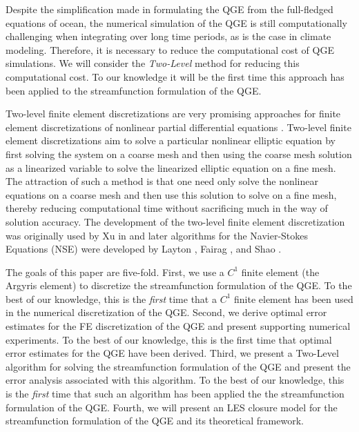 Despite the simplification made in formulating the QGE from the full-fledged
equations of ocean, the numerical simulation of the QGE is still computationally
challenging when integrating over long time periods, as is the case in climate
modeling. Therefore, it is necessary to reduce the computational cost of QGE
simulations. We will consider the \emph{Two-Level} method for reducing this
computational cost. To our knowledge it will be the first time this approach has
been applied to the streamfunction formulation of the QGE.

Two-level finite element discretizations are very promising approaches for
finite element discretizations of nonlinear partial differential equations
\cite{Fairag98,Layton93}. Two-level finite element discretizations aim to
solve a particular nonlinear elliptic equation by first solving the system on a
coarse mesh and then using the coarse mesh solution as a linearized variable to
solve the linearized elliptic equation on  a fine mesh. The attraction of such a
method is that one need only solve the nonlinear equations on a coarse mesh and
then use this solution to solve on a fine mesh, thereby reducing computational
time without sacrificing much in the way of solution accuracy. The development
of the two-level finite element discretization was originally used by Xu in
\cite{Xu94} and later algorithms for the Navier-Stokes Equations (NSE) were
developed by Layton \cite{Layton93}, Fairag \cite{Fairag98, Fairag03}, and Shao
\cite{Shao11}.

The goals of this paper are five-fold. First, we use a $C^1$ finite element (the
Argyris element) to discretize the streamfunction formulation of the QGE. To the
best of our knowledge, this is the \emph{first} time that a $C^1$ finite element
has been used in the numerical discretization of the QGE. Second, we derive
optimal error estimates for the FE discretization of the QGE and present
supporting numerical experiments. To the best of our knowledge, this is the
first time that optimal error estimates for the QGE have been derived.  Third,
we present a Two-Level algorithm for solving the streamfunction formulation of
the QGE and present the error analysis associated with this algorithm. To the
best of our knowledge, this is the \emph{first} time that such an algorithm has
been applied the the streamfunction formulation of the QGE.  Fourth, we will
present an LES closure model for the streamfunction formulation of the QGE and
its theoretical framework.
